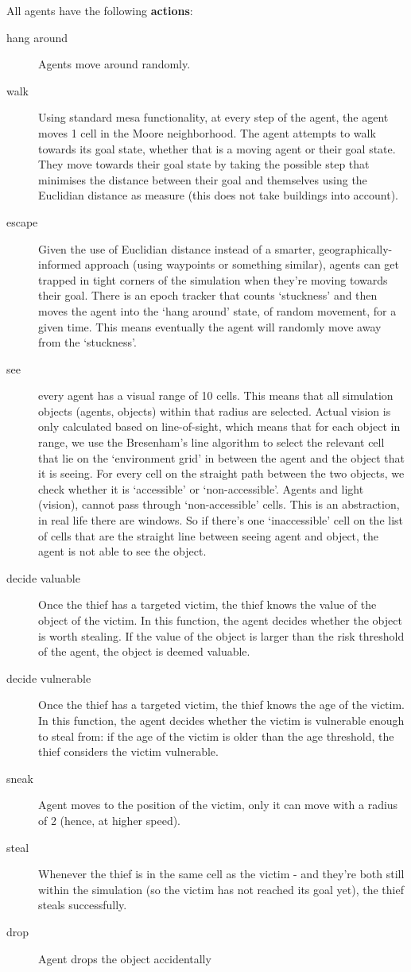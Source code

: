 \documentclass[12pt]{article}
\begin{document}
All agents have the following \textbf{actions}:

\begin{description}
\item [hang around] Agents move around randomly.
\item [walk] Using standard mesa functionality, at every step of the agent, the agent moves 1 cell in the Moore neighborhood. The agent attempts to walk towards its goal state, whether that is a moving agent or their goal state. They move towards their goal state by taking the possible step that minimises the distance between their goal and themselves using the Euclidian distance as measure (this does not take buildings into account).
\item [escape]  Given the use of Euclidian distance instead of a smarter, geographically-informed approach (using waypoints or something similar), agents can get trapped in tight corners of the simulation when they're moving towards their goal. There is an epoch tracker that counts `stuckness' and then moves the agent into the `hang around' state, of random movement, for a given time. This means eventually the agent will randomly move away from the `stuckness'.
\item [see] every agent has a visual range of 10 cells. This means that all simulation objects (agents, objects) within that radius are selected. Actual vision is only calculated based on line-of-sight, which means that for each object in range, we use the Bresenham's line algorithm to select the relevant cell that lie on the `environment grid' in between the agent and the object that it is seeing. For every cell on the straight path between the two objects, we check whether it is `accessible' or `non-accessible'. Agents and light (vision), cannot pass through `non-accessible' cells. This is an abstraction, in real life there are windows. So if there's one `inaccessible' cell on the list of cells that are the straight line between seeing agent and object, the agent is not able to see the object. 
\item [decide valuable] Once the thief has a targeted victim, the thief knows the value of the object of the victim. In this function, the agent decides whether the object is worth stealing. If the value of the object is larger than the risk threshold of the agent, the object is deemed valuable.
\item [decide vulnerable] Once the thief has a targeted victim, the thief knows the age of the victim. In this function, the agent decides whether the victim is vulnerable enough to steal from: if the age of the victim is older than the age threshold, the thief considers the victim vulnerable.
\item [sneak] Agent moves to the position of the victim, only it can move with a radius of 2 (hence, at higher speed).
\item [steal] Whenever the thief is in the same cell as the victim - and they're both still within the simulation (so the victim has not reached its goal yet), the thief steals successfully.
\item [drop] Agent drops the object accidentally
\end{description}
\end{document}
